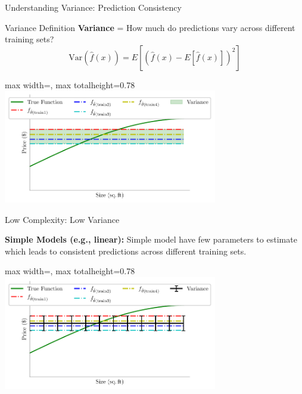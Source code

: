 \documentclass[10pt]{beamer}
\newcommand{\fitpic}[1]{\begin{adjustbox}{max width=\linewidth, max totalheight=0.78\textheight}#1\end{adjustbox}}
\begin{document}
\begin{frame}{Understanding Variance: Prediction Consistency}
\begin{definitionbox}{Variance Definition}
\textbf{Variance} = How much do predictions vary across different training sets?
$$\text{Var}(\hat{f}(x)) = E[(\hat{f}(x) - E[\hat{f}(x)])^2]$$
\end{definitionbox}

\begin{center}
\fitpic{\includegraphics[width=0.7\textwidth]{../assets/bias-variance/figures/var1.pdf}}
\end{center}


\end{frame}

\begin{frame}{Low Complexity: Low Variance}
\begin{keypointsbox}
\textbf{Simple Models (e.g., linear):} Simple model have few parameters to estimate which leads to consistent predictions across different training sets.

\end{keypointsbox}

\begin{center}
\fitpic{\includegraphics[width=0.7\textwidth]{../assets/bias-variance/figures/var2.pdf}}
\end{center}

\end{frame}
\end{document}

